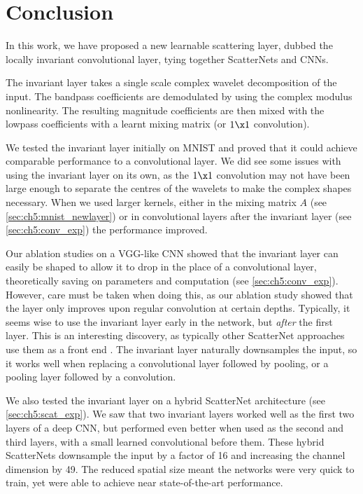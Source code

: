 \section{Conclusion}\label{sec:ch5:conclusion}
In this work, we have proposed a new learnable scattering layer, dubbed the
locally invariant convolutional layer, tying together ScatterNets and CNNs.

The invariant layer takes a single scale complex wavelet decomposition of the
input. The bandpass coefficients are demodulated by using the complex modulus
nonlinearity. The resulting magnitude coefficients are then mixed with the
lowpass coefficients with a learnt mixing matrix (or $1\x 1$ convolution). 

We tested the invariant layer initially on MNIST and proved that it could
achieve comparable performance to a convolutional layer.
We did see some issues with using the invariant layer on its own, as the $1\x 1$
convolution may not have been large enough to separate the centres of the
wavelets to make the complex shapes necessary. When we used larger kernels,
either in the mixing matrix $A$ (see \autoref{sec:ch5:mnist_newlayer}) or in
convolutional layers after the invariant layer (see \autoref{sec:ch5:conv_exp})
the performance improved.

Our ablation studies on a VGG-like CNN showed that the invariant layer can
easily be shaped to allow it to drop in the place of a convolutional layer,
theoretically saving on parameters and computation (see \autoref{sec:ch5:conv_exp}).
However, care must be taken when doing this, as our ablation study showed that
the layer only improves upon regular convolution at certain depths. Typically,
it seems wise to use the invariant layer early in the network, but \emph{after} the
first layer. This is an interesting discovery, as typically other ScatterNet
approaches use them as a front end \cite{oyallon_scaling_2017, singh_scatternet_2017}. The invariant layer naturally
downsamples the input, so it works well when replacing a convolutional layer
followed by pooling, or a pooling layer followed by a convolution. 

We also tested the invariant layer on a hybrid ScatterNet architecture (see
\autoref{sec:ch5:scat_exp}). We saw that two invariant layers worked well as the
first two layers of a deep CNN, but performed even better when used as the
second and third layers, with a small learned convolutional before them. These
hybrid ScatterNets downsample the input by a factor of 16 and increasing the
channel dimension by 49. The reduced spatial size meant the networks were very
quick to train, yet were able to achieve near state-of-the-art performance.


